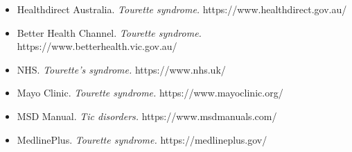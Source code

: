 \begin{itemize}
    \item Healthdirect Australia. \textit{Tourette syndrome.} https://www.healthdirect.gov.au/
    \item Better Health Channel. \textit{Tourette syndrome.} https://www.betterhealth.vic.gov.au/
    \item NHS. \textit{Tourette's syndrome.} https://www.nhs.uk/
    \item Mayo Clinic. \textit{Tourette syndrome.} https://www.mayoclinic.org/
    \item MSD Manual. \textit{Tic disorders.} https://www.msdmanuals.com/
    \item MedlinePlus. \textit{Tourette syndrome.} https://medlineplus.gov/
\end{itemize}
